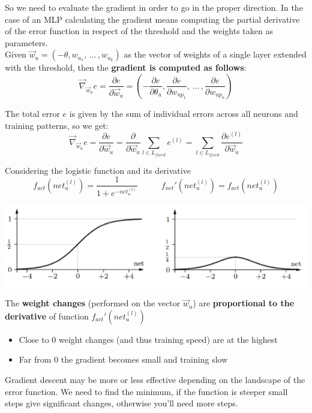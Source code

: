 So we need to evaluate the gradient in order to go in the proper direction. In the case of an MLP calculating the gradient means computing the partial derivative of the error function in respect of the threshold and the weights taken as parameters.\\

Given $\vec{w}_u = (-\theta, w_{u_1}, \, ... \, , w_{u_k})$ as the vector of weights of a single layer extended with the threshold, then the \textbf{gradient is computed as follows}:
$$ \vec{\nabla}_{\vec{w}_u} e = \frac{\partial e}{\partial \vec{w}_u} = \left(- \frac{\partial e}{\partial \theta_u}, \frac{\partial e}{\partial w_{up_1}}, \, ... \, , \frac{\partial e}{\partial w_{up_n}}\right) $$

The total error $e$ is given by the sum of individual errors across all neurons and training patterns, so we get: 
$$ \vec{\nabla}_{\vec{w}_u} e = \frac{\partial e}{\partial \vec{w}_u} = \frac{\partial }{\partial \vec{w}_u} \sum_{l \in L_{fixed}} e^{(l)} = \sum_{l \in L_{fixed}} \frac{\partial e^{(l)}}{\partial \vec{w}_u} $$ 

\newpage

Considering the logistic function and its derivative
$$ f_{act} (net_u^{(l)}) = \frac{1}{1 + e^{- net_u^{(l)}}} \;\;\;\;\;\;\;\;\;\; f_{net}' (net_u^{(l)}) =  f_{act} (net_u^{(l)})$$  
\begin{center}
	\includegraphics[width=0.9\columnwidth]{img/NN/logfunc1}
\end{center}

The \textbf{weight changes} (performed on the vector $\vec{w}_u$) are \textbf{proportional to the derivative} of function $f_{act}' (net_u^{(l)})$
\begin{itemize}
	\item Close to 0 weight changes (and thus training speed) are at the highest
	\item Far from 0 the gradient becomes small and training slow
\end{itemize}

Gradient descent may be more or less effective depending on the landscape of the error function. We need to find the minimum, if the function is steeper small steps give significant changes, otherwise you'll need more steps.\\

